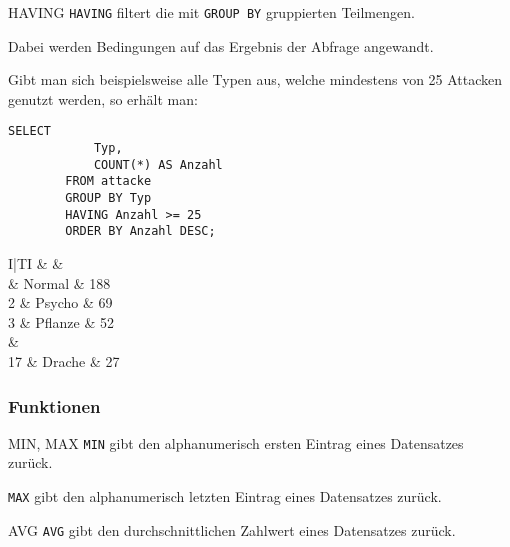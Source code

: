 \begin{sql}{HAVING}
    \texttt{HAVING} filtert die mit \texttt{GROUP BY} gruppierten Teilmengen.

    Dabei werden Bedingungen auf das Ergebnis der Abfrage angewandt.

    Gibt man sich beispielsweise alle Typen aus, welche mindestens von 25 Attacken genutzt werden, so erhält man:

    \begin{lstlisting}[language=mysql]
        SELECT
            Typ,
            COUNT(*) AS Anzahl
        FROM attacke
        GROUP BY Typ
        HAVING Anzahl >= 25
        ORDER BY Anzahl DESC;
    \end{lstlisting}

    \setcounter{rownum}{0}
    \begin{tabular}{I|TI}
                                   &    &  \\                          & Normal                    & 188                        \\
        2                          & Psycho                    & 69                         \\
        3                          & Pflanze                   & 52                         \\
         &                               \\
        17                         & Drache                    & 27                         \\
    \end{tabular}
\end{sql}

\subsubsection{Funktionen}

\begin{sql}{MIN, MAX}
    \texttt{MIN} gibt den alphanumerisch ersten Eintrag eines Datensatzes zurück.

    \texttt{MAX} gibt den alphanumerisch letzten Eintrag eines Datensatzes zurück.
\end{sql}

\begin{sql}{AVG}
    \texttt{AVG} gibt den durchschnittlichen Zahlwert eines Datensatzes zurück.
\end{sql}

